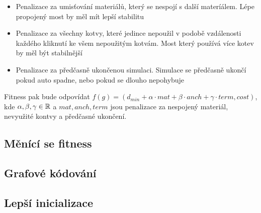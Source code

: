\begin{itemize}
    \item Penalizace za umisťování materiálů, který se nespojí s další materíálem. Lépe propojený most by měl mít lepší stabilitu
    \item Penalizace za všechny kotvy, které jedince nepoužil v podobě vzdálenosti každého kliknutí ke všem nepoužitým kotvám. Most který používá více kotev by měl být stabilnější
    \item Penalizace za předčasně ukončenou simulaci. Simulace se předčasně ukončí pokud auto spadne, nebo pokud se dlouho nepohybuje
\end{itemize}

Fitness pak bude odpovídat $f(g) = (d_{min} + \alpha \cdot mat + \beta \cdot anch + \gamma \cdot term, cost)$, kde $\alpha, \beta, \gamma \in \mathbb{R}$ a $mat, anch, term$ jsou penalizace za nespojený materiál, nevyužité kontvy a předčasné ukončení.

\subsection{Měnící se fitness}


\subsection{Grafové kódování}


\subsection{Lepší inicializace}

